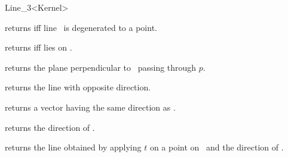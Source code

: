 \begin{ccRefClass} {Line_3<Kernel>}
\ccPredicates

       {returns  iff line \ccVar\ is degenerated to a point.}

       {returns  iff  lies on \ccVar.}


       {returns the plane perpendicular to \ccVar\ passing through $p$.}

       {returns the line with opposite direction.}

       {returns a vector having the same direction as \ccVar.}

       {returns the direction of \ccVar.}

       {returns the line obtained by applying $t$ on a point on \ccVar\ 
        and the direction of \ccVar.}

\ccSeeAlso
{}

\end{ccRefClass} 
